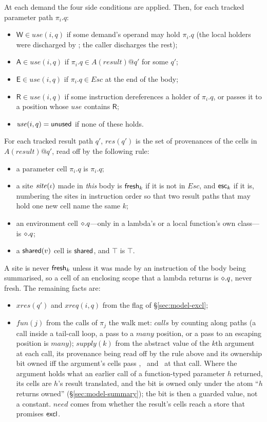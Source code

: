 At each demand the four side conditions are applied. Then, for each tracked parameter path
$\pi_i.q$:
\begin{itemize}
\item $\mathsf{W} \in \mathit{use}(i, q)$ if some demand's operand may hold $\pi_i.q$ (the local holders
were discharged by \Dead; the caller discharges the rest);
\item $\mathsf{A} \in \mathit{use}(i, q)$ if $\pi_i.q \in A(\mathit{result})@q'$ for some $q'$;
\item $\mathsf{E} \in \mathit{use}(i, q)$ if $\pi_i.q \in \mathit{Esc}$ at the end of the body;
\item $\mathsf{R} \in \mathit{use}(i, q)$ if some instruction dereferences a holder of $\pi_i.q$, or
passes it to a position whose $\mathit{use}$ contains $\mathsf{R}$;
\item $\mathit{use}(i, q) = \mathsf{unused}$ if none of these holds.
\end{itemize}
For each tracked result path $q'$, $\mathit{res}(q')$ is the set of provenances of the cells in
$A(\mathit{result})@q'$, read off by the following rule:
\begin{itemize}
\item a parameter cell $\pi_i.q$ is $\pi_i.q$;
\item a site $\mathit{site}(\iota)$ made in \emph{this} body is $\mathsf{fresh}_k$ if it is not in $\mathit{Esc}$, and
$\mathsf{esc}_k$ if it is, numbering the sites in instruction order so that two result paths that may hold one
new cell name the same $k$;
\item an environment cell $\diamond.q$---only in a lambda's or a local function's own class---is $\diamond.q$;
\item a $\mathsf{shared}(v)$ cell is $\mathsf{shared}$, and $\top$ is $\top$.
\end{itemize}
A site is never $\mathsf{fresh}_k$ unless it was made by an instruction of the body being summarised, so a cell
of an enclosing scope that a lambda returns is $\diamond.q$, never fresh. The remaining facts are:
\begin{itemize}
\item $\mathit{xres}(q')$ and $\mathit{xreq}(i, q)$ from the flag of \S\ref{sec:model-excl};
\item $\mathit{fun}(j)$ from the calls of $\pi_j$ the walk met: $\mathit{calls}$ by counting along
paths (a call inside a tail-call loop, a pass to a $\mathit{many}$ position, or a pass to an escaping
position is $\mathit{many}$); $\mathit{supply}(k)$ from the abstract value of the $k$th argument at each
call, its provenance being read off by the rule above and its ownership bit owned iff the argument's
cells pass \Dead, \Unescaped\ and \Disjoint\ at that call. Where the argument holds what an earlier call
of a function-typed parameter $h$ returned, its cells are $h$'s result translated, and the bit is owned
only under the atom ``$h$ returns owned'' (\S\ref{sec:model-summary}); the bit is then a guarded value,
not a constant. $\mathit{need}$ comes from whether the result's cells reach a store that promises $\mathsf{excl}$.
\end{itemize}
